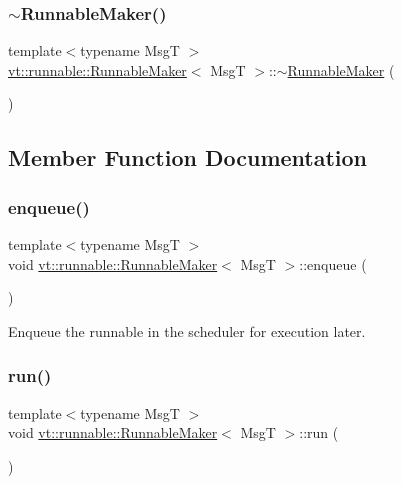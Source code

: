 \subsubsection{\texorpdfstring{$\sim$\+Runnable\+Maker()}{~RunnableMaker()}}
{\footnotesize\ttfamily template$<$typename MsgT $>$ \\
\hyperlink{structvt_1_1runnable_1_1_runnable_maker}{vt\+::runnable\+::\+Runnable\+Maker}$<$ MsgT $>$\+::$\sim$\hyperlink{structvt_1_1runnable_1_1_runnable_maker}{Runnable\+Maker} (\begin{DoxyParamCaption}{ }\end{DoxyParamCaption})\hspace{0.3cm}{\ttfamily [inline]}}



\subsection{Member Function Documentation}
\mbox{\label{structvt_1_1runnable_1_1_runnable_maker_a76516d824c744bdd347806012a78e19b}} 
\subsubsection{\texorpdfstring{enqueue()}{enqueue()}}
{\footnotesize\ttfamily template$<$typename MsgT $>$ \\
void \hyperlink{structvt_1_1runnable_1_1_runnable_maker}{vt\+::runnable\+::\+Runnable\+Maker}$<$ MsgT $>$\+::enqueue (\begin{DoxyParamCaption}{ }\end{DoxyParamCaption})}



Enqueue the runnable in the scheduler for execution later. 

\mbox{\label{structvt_1_1runnable_1_1_runnable_maker_a8fb3e1362dd6f746e991786654f5bd40}} 
\subsubsection{\texorpdfstring{run()}{run()}}
{\footnotesize\ttfamily template$<$typename MsgT $>$ \\
void \hyperlink{structvt_1_1runnable_1_1_runnable_maker}{vt\+::runnable\+::\+Runnable\+Maker}$<$ MsgT $>$\+::run (\begin{DoxyParamCaption}{ }\end{DoxyParamCaption})\hspace{0.3cm}{\ttfamily [inline]}}




